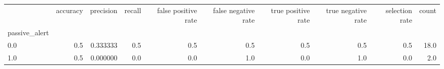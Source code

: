 \begin{tabular}{lrrrrrrrrr}
\toprule
{} &  accuracy &  precision &  recall &  false positive rate &  false negative rate &  true positive rate &  true negative rate &  selection rate &  count \\
passive\_alert &           &            &         &                      &                      &                     &                     &                 &        \\
\midrule
0.0           &       0.5 &   0.333333 &     0.5 &                  0.5 &                  0.5 &                 0.5 &                 0.5 &             0.5 &   18.0 \\
1.0           &       0.5 &   0.000000 &     0.0 &                  0.0 &                  1.0 &                 0.0 &                 1.0 &             0.0 &    2.0 \\
\bottomrule
\end{tabular}
